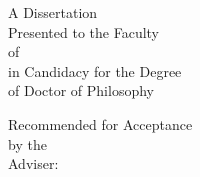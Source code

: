 \begin{titlepage}

\makeatletter
\thispagestyle{empty}
\sc
\vspace*{0in}
\begin{center}
  \LARGE \@title
\end{center}
\vspace{.6in}
\begin{center}
	\@author
	\end{center}
\vspace{.6in}
\begin{center}
  A Dissertation \\
  Presented to the Faculty \\
  of \@university \\
  in Candidacy for the Degree \\
  of Doctor of Philosophy
\end{center}
\vspace{.3in}
\begin{center}
  Recommended for Acceptance \\
  by the \@department \\
  Adviser: \@adviser
\end{center}
\vspace{.3in}
\begin{center}

\@date

\end{center}
\makeatother

\end{titlepage}